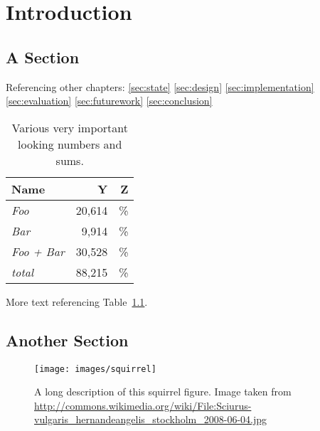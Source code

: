 \chapter{Introduction}
\label{sec:intro}



\section{A Section}

Referencing other chapters: \ref{sec:state} \ref{sec:design}
\ref{sec:implementation} \ref{sec:evaluation} \ref{sec:futurework}
\ref{sec:conclusion}

\begin{table}[htp]
  \centering
  \begin{tabular}{lrr}
    \textbf{Name} & \textbf{Y} & \textbf{Z} \\
    \hline
    \textit{Foo} & 20,614 & \unit[23]{\%} \\
    \textit{Bar} & 9,914 & \unit[11]{\%} \\
    \textit{Foo + Bar} & 30,528 & \unit[34]{\%} \\
    \hline
    \textit{total} & 88,215 & \unit[100]{\%} \\

  \end{tabular}
  \caption[Some interesting numbers]{Various very important looking numbers and sums.}
  \label{tab:numbers}
\end{table}

More text referencing Table~\ref{tab:numbers}.

\section{Another Section}

\begin{figure}[tbp]
  \centering
  \texttt{[image: images/squirrel]}
  \caption[Short description]{A long description of this squirrel figure.
  Image taken from
  \url{http://commons.wikimedia.org/wiki/File:Sciurus-vulgaris_hernandeangelis_stockholm_2008-06-04.jpg}}
  \label{fig:squirrel}
\end{figure}


